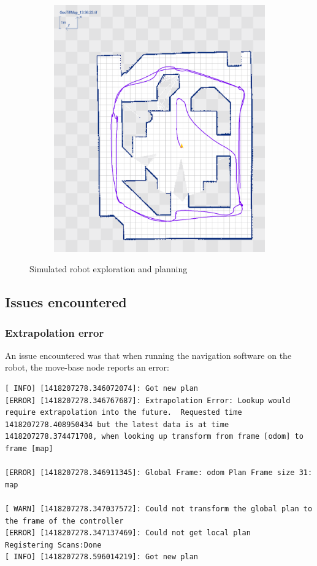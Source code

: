 \documentclass[a4paper]{article}
\begin{document}
\begin{figure}[h!]
\begin{subfigure}[b]{0.4\textwidth}
  \end{subfigure}
  \begin{subfigure}[b]{0.4\textwidth}
    \includegraphics[width=\textwidth,height=\textheight,keepaspectratio]{img/move_square/6.png}
  \end{subfigure}
  \caption{Simulated robot exploration and planning}
\end{figure}


\subsection{Issues encountered}
\subsubsection{Extrapolation error}
An issue encountered was that when running the navigation software on the robot,
the move-base node reports an error:

\begin{lstlisting}[caption=Error message when running on different pc]
[ INFO] [1418207278.346072074]: Got new plan
[ERROR] [1418207278.346767687]: Extrapolation Error: Lookup would require extrapolation into the future.  Requested time 1418207278.408950434 but the latest data is at time 1418207278.374471708, when looking up transform from frame [odom] to frame [map]

[ERROR] [1418207278.346911345]: Global Frame: odom Plan Frame size 31: map

[ WARN] [1418207278.347037572]: Could not transform the global plan to the frame of the controller
[ERROR] [1418207278.347137469]: Could not get local plan
Registering Scans:Done
[ INFO] [1418207278.596014219]: Got new plan
\end{lstlisting}
\end{document}
